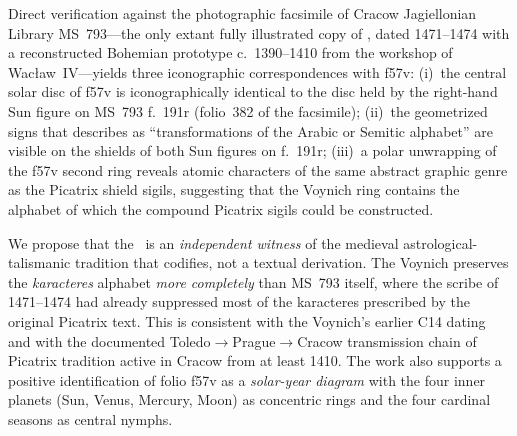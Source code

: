 Direct verification against the photographic facsimile of Cracow Jagiellonian Library MS~793---the only extant fully illustrated copy of \emph{\msc}, dated 1471--1474 with a reconstructed Bohemian prototype c.~1390--1410 from the workshop of Wac\l aw~IV---yields three iconographic correspondences with f57v: (i)~the central solar disc of f57v is iconographically identical to the disc held by the right-hand Sun figure on MS~793 f.~191r (folio~382 of the facsimile); (ii)~the geometrized signs that \citet{sniezynska2009} describes as ``transformations of the Arabic or Semitic alphabet'' are visible on the shields of both Sun figures on f.~191r; (iii)~a polar unwrapping of the f57v second ring reveals atomic characters of the same abstract graphic genre as the Picatrix shield sigils, suggesting that the Voynich ring contains the alphabet of which the compound Picatrix sigils could be constructed.

We propose that the \vms\ is an \emph{independent witness} of the medieval astrological-talismanic tradition that \emph{\msc} codifies, not a textual derivation. The Voynich preserves the \emph{karacteres} alphabet \emph{more completely} than MS~793 itself, where the scribe of 1471--1474 had already suppressed most of the karacteres prescribed by the original Picatrix text. This is consistent with the Voynich's earlier C14 dating and with the documented Toledo$\rightarrow$Prague$\rightarrow$Cracow transmission chain of Picatrix tradition active in Cracow from at least 1410. The work also supports a positive identification of folio f57v as a \emph{solar-year diagram} with the four inner planets (Sun, Venus, Mercury, Moon) as concentric rings and the four cardinal seasons as central nymphs.

